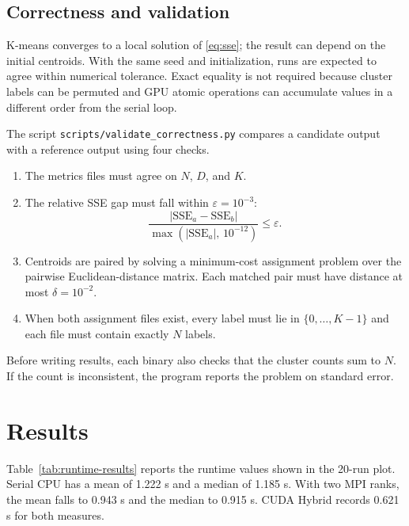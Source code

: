 \documentclass[conference]{IEEEtran}
\DeclareRobustCommand{\file}[1]{\texttt{#1}}
\begin{document}
\subsection{Correctness and validation}
\label{sec:correct}

K-means converges to a local solution of \eqref{eq:sse}; the result can depend on the initial centroids. With the same seed and initialization, runs are expected to agree within numerical tolerance. Exact equality is not required because cluster labels can be permuted and GPU atomic operations can accumulate values in a different order from the serial loop.

The script \file{scripts/validate\_correctness.py} compares a candidate output with a reference output using four checks.

\begin{enumerate}
  \item The metrics files must agree on $N$, $D$, and $K$.
  \item The relative SSE gap must fall within $\varepsilon = 10^{-3}$:
    \begin{equation}
      \frac{|\mathrm{SSE}_a - \mathrm{SSE}_b|}{\max(|\mathrm{SSE}_a|,\,10^{-12})} \le \varepsilon .
      \label{eq:sse-tol}
    \end{equation}
  \item Centroids are paired by solving a minimum-cost assignment problem over the pairwise Euclidean-distance matrix. Each matched pair must have distance at most $\delta=10^{-2}$.
  \item When both assignment files exist, every label must lie in $\{0,\ldots,K{-}1\}$ and each file must contain exactly $N$ labels.
\end{enumerate}

Before writing results, each binary also checks that the cluster counts sum to $N$. If the count is inconsistent, the program reports the problem on standard error.

\section{Results}
\label{sec:results}
Table~\ref{tab:runtime-results} reports the runtime values shown in the 20-run plot. Serial CPU has a mean of 1.222 s and a median of 1.185 s. With two MPI ranks, the mean falls to 0.943 s and the median to 0.915 s. CUDA Hybrid records 0.621 s for both measures.
\end{document}
